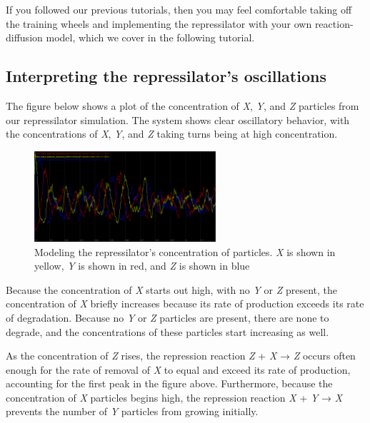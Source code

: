 If you followed our previous tutorials, then you may feel comfortable taking off the training wheels and implementing the repressilator with your own reaction-diffusion model, which we cover in the following tutorial.


\FloatBarrier
{}
\subsection{Interpreting the repressilator's oscillations}

The figure below shows a plot of the concentration of \textit{X}, \textit{Y}, and \textit{Z} particles from our repressilator simulation. The system shows clear oscillatory behavior, with the concentrations of \textit{X}, \textit{Y}, and \textit{Z} taking turns being at high concentration.

\begin{qbox}\end{qbox} 

\begin{figure}[h]
\centering
\mySfFamily
\includegraphics[width = 0.6\textwidth]{../images/repressilator_chart.png}
\caption{Modeling the repressilator's concentration of particles. \textit{X} is shown in yellow, \textit{Y} is shown in red, and \textit{Z} is shown in blue}
\label{fig:repressilator_chart}
\end{figure}

Because the concentration of \textit{X} starts out high, with no \textit{Y} or \textit{Z} present, the concentration of \textit{X} briefly increases because its rate of production exceeds its rate of degradation. Because no \textit{Y} or \textit{Z} particles are present, there are none to degrade, and the concentrations of these particles start increasing as well.

As the concentration of \textit{Z} rises, the repression reaction \textit{Z} + \textit{X} → \textit{Z} occurs often enough for the rate of removal of \textit{X} to equal and exceed its rate of production, accounting for the first peak in the figure above. Furthermore, because the concentration of \textit{X} particles begins high, the repression reaction \textit{X} + \textit{Y} → \textit{X} prevents the number of \textit{Y} particles from growing initially.

